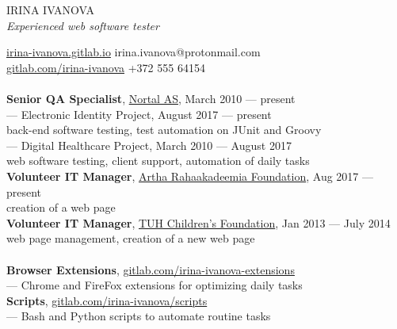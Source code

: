 \documentclass[a4paper, 12pt]{article}
\begin{document}
\begin{center}
  {\LARGE{IRINA IVANOVA}}\\
  \textit{Experienced web software tester}
\end{center}
\href{https://irina-ivanova.gitlab.io}{irina-ivanova.gitlab.io}
\hspace{4.5cm}
irina.ivanova@protonmail.com\\
\href{https://gitlab.com/irina-ivanova}{gitlab.com/irina-ivanova}
\hspace{6.6cm}
+372 555 64154\\

\\
\textbf{Senior QA Specialist}, \href{https://nortal.com}{Nortal AS}, {\footnotesize{March 2010 --- present}}\\
\indent --- Electronic Identity Project, {\footnotesize{August 2017 --- present}}\\
\indent \indent \indent back-end software testing, test automation on JUnit and Groovy\\
\indent --- Digital Healthcare Project, {\footnotesize{March 2010 --- August 2017}}\\
\indent \indent \indent web software testing, client support, automation of daily tasks\\
\textbf{Volunteer IT Manager}, \href{https://rahaakadeemia.ee}{Artha Rahaakadeemia Foundation}, {\footnotesize{Aug 2017 --- present}}\\
\indent \indent \indent creation of a web page\\
\textbf{Volunteer IT Manager}, \href{https://www.lastefond.ee}{TUH Children's Foundation}, {\footnotesize{Jan 2013 --- July 2014}}\\
\indent \indent \indent web page management, creation of a new web page\\

\\
\textbf{Browser Extensions}, \href{https://gitlab.com/irina-ivanova-extensions}{gitlab.com/irina-ivanova-extensions}\\
\indent --- Chrome and FireFox extensions for optimizing daily tasks\\
\textbf{Scripts}, \href{https://gitlab.com/irina-ivanova/scripts}{gitlab.com/irina-ivanova/scripts}\\
\indent --- Bash and Python scripts to automate routine tasks\\
\end{document}
